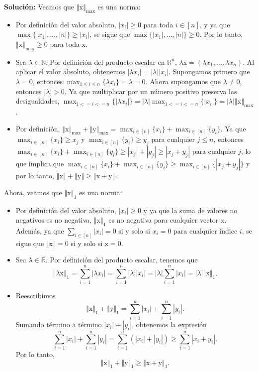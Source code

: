 \documentclass[12pt]{article}
\newcommand{\abs}[1]{\left\vert#1\right\vert}
\newcommand{\norm}[1]{\left\Vert#1\right\Vert}
\newcommand{\R}{\mathbb R}
\newcommand{\x}{\mathrm x}
\newcommand{\y}{\mathrm y}
\begin{document}
\begin{enumerate}
\begin{enumerate}[(1)]
\textbf{Solución: } Veamos que \(\norm{\x}_{\max}\) es una norma:
    \begin{itemize}
        \item Por definición del valor absoluto, \(\abs{x_i} \geq 0\) para toda \(i \in [n]\), y ya que \(\max\{\abs{x_1}, \dots, \abs{n}\} \geq \abs{x_i}\), se sigue que \(\max\{\abs{x_1}, \dots, \abs{n}\} \geq 0\). Por lo tanto, \(\norm{\x}_{\max} \geq 0\) para toda \(\x\).
        \item Sea \(\lambda \in \R\). Por definición del producto escalar en \(\R^n\), \(\lambda \x = (\lambda x_1, \dots, \lambda x_n)\). Al aplicar el valor absoluto, obtenemos \(\abs{\lambda x_i} = \abs{\lambda} \abs{x_i}\). Supongamos primero que \(\lambda = 0\), entonces \(\max_{1 \leq i \leq n} \{\lambda x_i\} = \lambda = 0\). Ahora supongamos que \(\lambda \neq 0\), entonces \(\abs{\lambda} > 0\). Ya que multiplicar por un número positivo preserva las desigualdades, \(\max_{1 <= i <= n}\{\abs{\lambda x_i}\} = \abs{\lambda} \max_{1 <= i <= n}\{\abs{x_i}\} = \abs{\lambda} \norm{\x}_{\max}\).
        \item Por definición, \(\norm{\x}_{\max} + \norm{\y}_{\max} = \max_{i\in[n]}\{x_i\} + \max_{i\in[n]}\{y_i\}\). Ya que \(\max_{i\in[n]}\{x_i\} \geq x_j\) y \(\max_{i\in[n]}\{y_i\} \geq y_j\) para cualquier \(j \leq n\), entonces \(\max_{i\in[n]}\{x_i\} + \max_{i\in[n]}\{y_i\} \geq \abs{x_j} + \abs{y_j} \geq \abs{x_j + y_j}\) para cualquier \(j\), lo que implica que \(\max_{i\in[n]}\{x_i\} + \max_{i\in[n]}\{y_i\} \geq \max_{i \in [n]}\{\abs{x_j + y_j}\}\) y por lo tanto, \(\norm{\x} + \norm{\y} \geq \norm{\x + \y}\).
    \end{itemize}
Ahora, veamos que \(\norm{\x}_1\) es una norma:
\begin{itemize}
    \item Por definición del valor absoluto, \(\abs{x_i} \geq 0\) y ya que la suma de valores no negativos es no negativa, \(\norm{\x}_1\) es no negativa para cualquier vector \(\x\). Además, ya que \(\sum_{i \in [n]}|x_i| = 0\) si y solo si \(x_i = 0\) para cualquier índice \(i\), se sigue que \(\norm{\x} = 0\) si y solo si \(\x = 0\).
    \item Sea \(\lambda \in \mathbb{R}\). Por definición del producto escalar, tenemos que 
    \[\norm{\lambda \x}_1 = \sum_{i = 1}^{n}\abs{\lambda x_i} = \sum_{i = 1}^{n}\abs{\lambda}\abs{x_i} = \abs{\lambda}\sum_{i = 1}^{n}\abs{x_i} = \abs{\lambda}\norm{\x}_1.\]
    \item Reescribimos
    \[
    \norm{\x}_1 + \norm{\y}_1 = \sum_{i = 1}^{n}\abs{x_i} + \sum_{i = 1}^{n}\abs{y_i}.
    \]
    Sumando término a término \(\abs{x_i} + \abs{y_i}\), obtenemos la expresión
    \[
    \sum_{i = 1}^{n}\abs{x_i} + \sum_{i = 1}^{n}\abs{y_i} = \sum_{i = 1}^{n}(\abs{x_i} + \abs{y_i}) \geq \sum_{i = 1}^{n}\abs{x_i + y_i}.
    \]
    Por lo tanto, 
    \[
    \norm{\x}_1 + \norm{\y}_1 \geq \norm{\x + \y}_1.
    \]
    

\end{itemize}
\end{enumerate}
\end{enumerate}
\end{document}
